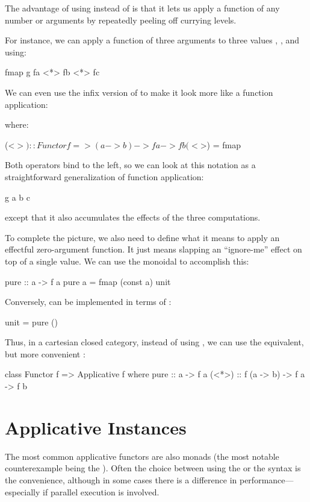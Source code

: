 \documentclass[DaoFP]{subfiles}
\begin{document}
The advantage of using \hask{<*>} instead of \hask{>*<} is that it lets us apply a function of any number or arguments by repeatedly peeling off currying levels. 

For instance, we can apply a function of three arguments  to three values , , and  using:
\begin{haskell}
fmap g fa <*> fb <*> fc
\end{haskell}
We can even use the infix version \index{\hask{<$>}}\hask{<$>} of  to make it look more like a function application:
where:
\begin{haskell}
(<$>) :: Functor f => (a -> b) -> f a -> f b
(<$>) = fmap
\end{haskell}
Both operators bind to the left, so we can look at this notation as a straightforward generalization of function application:
\begin{haskell}
g a b c
\end{haskell}
except that it also accumulates the effects of the three computations.

To complete the picture, we also need to define what it means to apply an effectful zero-argument function. It just means slapping an ``ignore-me'' effect on top of a single value. We can use the monoidal  to accomplish this:
\begin{haskell}
pure :: a -> f a
pure a = fmap (const a) unit
\end{haskell}
Conversely,  can be implemented in terms of :
\begin{haskell}
unit = pure ()
\end{haskell}

Thus, in a cartesian closed category, instead of using , we can use the equivalent, but more convenient :
\begin{haskell}
class Functor f => Applicative f where
    pure  :: a -> f a
    (<*>) :: f (a -> b) -> f a -> f b
\end{haskell}

\section{Applicative Instances}

The most common applicative functors are also monads (the most notable counterexample being the ). Often the choice between using the  or the  syntax is the convenience, although in some cases there is a difference in performance---especially if parallel execution is involved.
\end{document}
